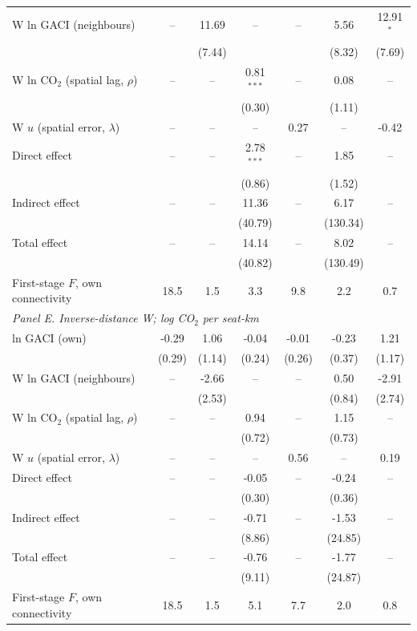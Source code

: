 \documentclass[12pt]{extarticle}
\begin{document}
\begin{table}[H]
{\begin{threeparttable}
\begin{tabular}{lcccccc}
  W ln GACI (neighbours) & -- & 11.69 & -- & -- & 5.56 & 12.91$^{*}$ \\
   &  & (7.44) &  &  & (8.32) & (7.69) \\
  W ln CO$_2$ (spatial lag, $\rho$) & -- & -- & 0.81$^{***}$ & -- & 0.08 & -- \\
   &  &  & (0.30) &  & (1.11) &  \\
  W $u$ (spatial error, $\lambda$) & -- & -- & -- & 0.27 & -- & -0.42 \\
  Direct effect & -- & -- & 2.78$^{***}$ & -- & 1.85 & -- \\
   &  &  & (0.86) &  & (1.52) &  \\
  Indirect effect & -- & -- & 11.36 & -- & 6.17 & -- \\
   &  &  & (40.79) &  & (130.34) &  \\
  Total effect & -- & -- & 14.14 & -- & 8.02 & -- \\
   &  &  & (40.82) &  & (130.49) &  \\
  First-stage $F$, own connectivity & 18.5 & 1.5 & 3.3 & 9.8 & 2.2 & 0.7 \\
\midrule
\multicolumn{7}{l}{\textit{Panel E. Inverse-distance W; log CO$_2$ per seat-km}} \\
  ln GACI (own) & -0.29 & 1.06 & -0.04 & -0.01 & -0.23 & 1.21 \\
   & (0.29) & (1.14) & (0.24) & (0.26) & (0.37) & (1.17) \\
  W ln GACI (neighbours) & -- & -2.66 & -- & -- & 0.50 & -2.91 \\
   &  & (2.53) &  &  & (0.84) & (2.74) \\
  W ln CO$_2$ (spatial lag, $\rho$) & -- & -- & 0.94 & -- & 1.15 & -- \\
   &  &  & (0.72) &  & (0.73) &  \\
  W $u$ (spatial error, $\lambda$) & -- & -- & -- & 0.56 & -- & 0.19 \\
  Direct effect & -- & -- & -0.05 & -- & -0.24 & -- \\
   &  &  & (0.30) &  & (0.36) &  \\
  Indirect effect & -- & -- & -0.71 & -- & -1.53 & -- \\
   &  &  & (8.86) &  & (24.85) &  \\
  Total effect & -- & -- & -0.76 & -- & -1.77 & -- \\
   &  &  & (9.11) &  & (24.87) &  \\
  First-stage $F$, own connectivity & 18.5 & 1.5 & 5.1 & 7.7 & 2.0 & 0.8 \\

\end{tabular}
\end{threeparttable}}
\end{table}
\end{document}

